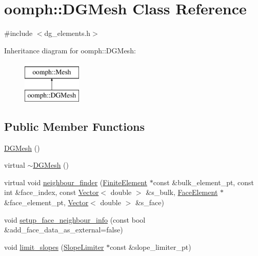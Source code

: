 \hypertarget{classoomph_1_1DGMesh}{}\section{oomph\+:\+:D\+G\+Mesh Class Reference}
\label{classoomph_1_1DGMesh}


{\ttfamily \#include $<$dg\+\_\+elements.\+h$>$}

Inheritance diagram for oomph\+:\+:D\+G\+Mesh\+:\begin{figure}[H]
\begin{center}
\leavevmode
\includegraphics[height=2.000000cm]{classoomph_1_1DGMesh}
\end{center}
\end{figure}
\subsection*{Public Member Functions}
\begin{DoxyCompactItemize}
\item 
\hyperlink{classoomph_1_1DGMesh_a6c55e53bed6291fcc188aad8a594c026}{D\+G\+Mesh} ()
\item 
virtual \hyperlink{classoomph_1_1DGMesh_a26cbcb2fb7d9546ce3c6c4b382b162cd}{$\sim$\+D\+G\+Mesh} ()
\item 
virtual void \hyperlink{classoomph_1_1DGMesh_a87c47885b2e96fe1559b269686ebb7b7}{neighbour\+\_\+finder} (\hyperlink{classoomph_1_1FiniteElement}{Finite\+Element} $\ast$const \&bulk\+\_\+element\+\_\+pt, const int \&face\+\_\+index, const \hyperlink{classoomph_1_1Vector}{Vector}$<$ double $>$ \&s\+\_\+bulk, \hyperlink{classoomph_1_1FaceElement}{Face\+Element} $\ast$\&face\+\_\+element\+\_\+pt, \hyperlink{classoomph_1_1Vector}{Vector}$<$ double $>$ \&s\+\_\+face)
\item 
void \hyperlink{classoomph_1_1DGMesh_ac8839d6d15a037536217b84e32dd2ae3}{setup\+\_\+face\+\_\+neighbour\+\_\+info} (const bool \&add\+\_\+face\+\_\+data\+\_\+as\+\_\+external=false)
\item 
void \hyperlink{classoomph_1_1DGMesh_a0fd53356d91d991a8ad68e8a6ceb3860}{limit\+\_\+slopes} (\hyperlink{classoomph_1_1SlopeLimiter}{Slope\+Limiter} $\ast$const \&slope\+\_\+limiter\+\_\+pt)
\end{DoxyCompactItemize}

